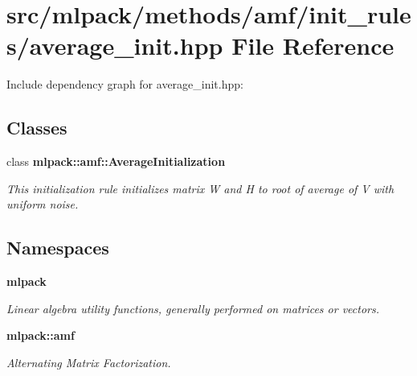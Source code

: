 \section{src/mlpack/methods/amf/init\-\_\-rules/average\-\_\-init.hpp File Reference}
\label{average__init_8hpp}
Include dependency graph for average\-\_\-init.\-hpp\-:
\subsection*{Classes}
\begin{DoxyCompactItemize}
\item 
class {\bf mlpack\-::amf\-::\-Average\-Initialization}
\begin{DoxyCompactList}\small\item\em This initialization rule initializes matrix W and H to root of average of V with uniform noise. \end{DoxyCompactList}\end{DoxyCompactItemize}
\subsection*{Namespaces}
\begin{DoxyCompactItemize}
\item 
{\bf mlpack}
\begin{DoxyCompactList}\small\item\em Linear algebra utility functions, generally performed on matrices or vectors. \end{DoxyCompactList}\item 
{\bf mlpack\-::amf}
\begin{DoxyCompactList}\small\item\em Alternating Matrix Factorization. \end{DoxyCompactList}\end{DoxyCompactItemize}
